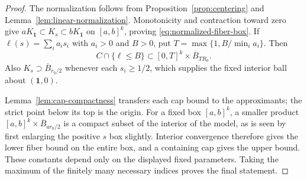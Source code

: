 \begin{proof}
The normalization follows from Proposition~\ref{prop:centering}
and Lemma~\ref{lem:linear-normalization}.  Monotonicity and contraction
toward zero give
$aK_{\mathbf1}\subset K_s\subset bK_{\mathbf1}$ on $[a,b]^k$,
proving \eqref{eq:normalized-fiber-box}.
If $\ell(s)=\sum_i a_i s_i$ with $a_i>0$ and $B>0$, put
$T=\max\{1,B/\min_i a_i\}$.  Then
\[
 C\cap\{\ell\le B\}
 \subset [0,T]^k\times\overline B_{TR_0}.
\]
Also $K_s\supset\overline B_{r_0/2}$ whenever each
$s_i\ge1/2$, which supplies the fixed interior ball about
$(\mathbf1,0)$.

Lemma~\ref{lem:cap-compactness} transfers each cap bound to the
approximants; the strict point below its top is the origin.
For a fixed box $[a,b]^k$, a smaller product
$[a,b]^k\times\overline B_{ar_0/2}$ is a compact subset of the
interior of the model, as is seen by first enlarging the positive
$s$ box slightly.  Interior convergence therefore gives the lower
fiber bound on the entire box, and a containing cap gives the upper
bound.  These constants depend only on the displayed fixed
parameters.  Taking the maximum of the finitely many necessary
indices proves the final statement.
\end{proof}
